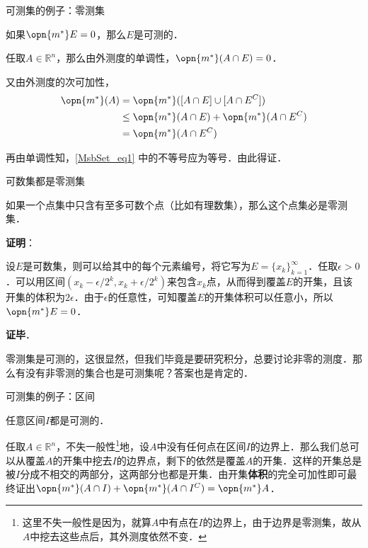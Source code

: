 \begin{example}{可测集的例子：零测集}

如果$\opn{m^*}E=0$，那么$E$是可测的．

任取$A\in\mathbb{R}^n$，那么由外测度的单调性，$\opn{m^*}(A\cap E)=0$．

又由外测度的次可加性，
\begin{equation}\label{MsbSet_eq1}
\begin{aligned}
\opn{m^*}(A)&=\opn{m^*}([A\cap E]\cup[A\cap E^C])\\
&\leq \opn{m^*}(A\cap E)+\opn{m^*}(A\cap E^C)\\
&=\opn{m^*}(A\cap E^C)
\end{aligned}
\end{equation}

再由单调性知，\autoref{MsbSet_eq1} 中的不等号应为等号．由此得证．

\end{example}

\begin{theorem}{可数集都是零测集}\label{MsbSet_the4}

如果一个点集中只含有至多可数个点（比如有理数集），那么这个点集必是零测集．

\end{theorem}

\textbf{证明}：

设$E$是可数集，则可以给其中的每个元素编号，将它写为$E=\{x_k\}_{k=1}^\infty$．任取$\epsilon>0$．可以用区间$(x_k-\epsilon/2^k, x_k+\epsilon/2^k)$来包含$x_k$点，从而得到覆盖$E$的开集，且该开集的体积为$2\epsilon$．由于$\epsilon$的任意性，可知覆盖$E$的开集体积可以任意小，所以$\opn{m^*}E=0$．

\textbf{证毕}．

零测集是可测的，这很显然，但我们毕竟是要研究积分，总要讨论非零的测度．那么有没有非零测的集合也是可测集呢？答案也是肯定的．

\begin{example}{可测集的例子：区间}\label{MsbSet_ex1}

任意区间$I$都是可测的．

任取$A\in\mathbb{R}^n$，不失一般性\footnote{这里不失一般性是因为，就算$A$中有点在$I$的边界上，由于边界是零测集，故从$A$中挖去这些点后，其外测度依然不变．}地，设$A$中没有任何点在区间$I$的边界上．那么我们总可以从覆盖$A$的开集中挖去$I$的边界点，剩下的依然是覆盖$A$的开集．这样的开集总是被$I$分成不相交的两部分，这两部分也都是开集．由开集\textbf{体积}的完全可加性即可最终证出$\opn{m^*}(A\cap I)+\opn{m^*}(A\cap I^C)=\opn{m^*}A$．

\end{example}

